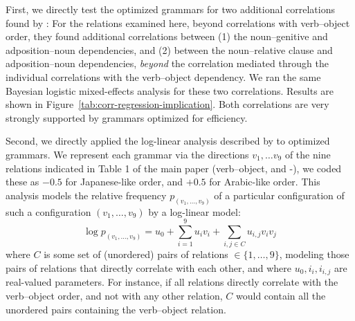 \documentclass[10pt,twoside,lineno]{article}
\begin{document}
First, we directly test the optimized grammars for two additional correlations found by \citet{justeson1990explanation}:
For the relations examined here, beyond correlations with verb--object order, they found additional correlations between (1) the noun--genitive and adposition--noun dependencies, and (2) between the noun--relative clause and adposition--noun dependencies, \emph{beyond} the correlation mediated through the individual correlations with the verb--object dependency.
We ran the same Bayesian logistic mixed-effects analysis for these two correlations.
Results are shown in Figure~\ref{tab:corr-regression-implication}.
Both correlations are very strongly supported by grammars optimized for efficiency.

Second, we directly applied the log-linear analysis described by \citet{justeson1990explanation} to optimized grammars.
We represent each grammar via the directions $v_1, \dots v_9$ of the nine relations indicated in Table 1 of the main paper (verb--object, and -), we coded these as $-0.5$ for Japanese-like order, and $+0.5$ for Arabic-like order.
This analysis models the relative frequency $p_{(v_1, \dots, v_9)}$ of a particular configuration of such a configuration $(v_1, \dots, v_9)$ by a log-linear model:
\begin{equation}
	\log p_{(v_1, \dots, v_9)} = u_0 + \sum_{i=1}^9 u_i v_i + \sum_{i, j \in C} u_{i,j} v_{i} v_{j}
\end{equation}
where $C$ is some set of (unordered) pairs of relations $\in \{1, \dots, 9\}$, modeling those pairs of relations that directly correlate with each other, and where $u_0, i_i, i_{i,j}$ are real-valued parameters.
For instance, if all relations directly correlate with the verb--object order, and not with any other relation, $C$ would contain all the unordered pairs containing the verb--object relation.
\end{document}
